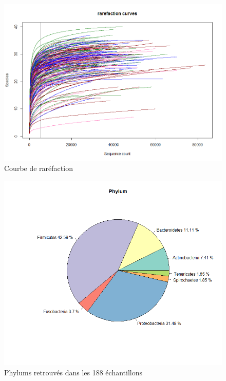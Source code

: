 \documentclass[12pt,a4paper]{article}
\begin{document}
\begin{figure}[!h]
\begin{center}
\includegraphics[scale=0.5]{img/rarefaction.png}\hfill
\end{center}
\caption{Courbe de raréfaction}
\label{rarefaction}
\end{figure}


\begin{figure}[!ht]
\begin{center}
\includegraphics[scale=0.5]{img/phylum.png}\hfill
\end{center}
\caption{Phylums retrouvés dans les 188 échantillons}
\label{phylum}
\end{figure}
\end{document}
